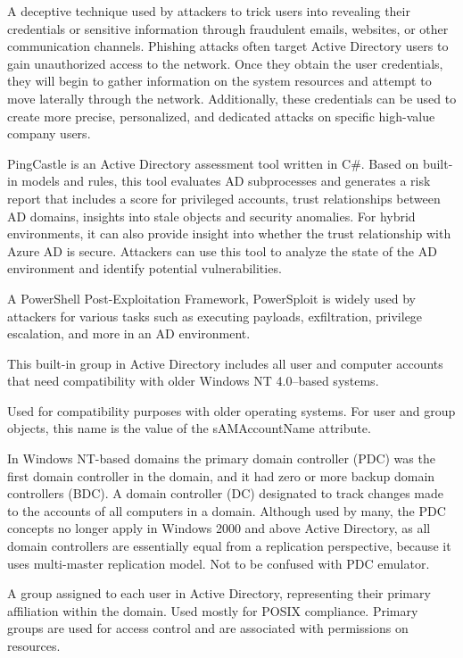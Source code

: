  A deceptive technique used by attackers to trick users into revealing their credentials or sensitive information through fraudulent emails, websites, or other communication channels. Phishing attacks often target Active Directory users to gain unauthorized access to the network. Once they obtain the user credentials, they will begin to gather information on the system resources and attempt to move laterally through the network. Additionally, these credentials can be used to create more precise, personalized, and dedicated attacks on specific high-value company users.

 PingCastle is an Active Directory assessment tool written in C#. Based on built-in models and rules, this tool evaluates AD subprocesses and generates a risk report that includes a score for privileged accounts, trust relationships between AD domains, insights into stale objects and security anomalies. For hybrid environments, it can also provide insight into whether the trust relationship with Azure AD is secure. Attackers can use this tool to analyze the state of the AD environment and identify potential vulnerabilities.

 A PowerShell Post-Exploitation Framework, PowerSploit is widely used by attackers for various tasks such as executing payloads, exfiltration, privilege escalation, and more in an AD environment.

 This built-in group in Active Directory includes all user and computer accounts that need compatibility with older Windows NT 4.0–based systems.

 Used for compatibility purposes with older operating systems. For user and group objects, this name is the value of the sAMAccountName attribute.

 In Windows NT-based domains the primary domain controller (PDC) was the first domain controller in the domain, and it had zero or more backup domain controllers (BDC). A domain controller (DC) designated to track changes made to the accounts of all computers in a domain. Although used by many, the PDC concepts no longer apply in Windows 2000 and above Active Directory, as all domain controllers are essentially equal from a replication perspective, because it uses multi-master replication model. Not to be confused with PDC emulator.

 A group assigned to each user in Active Directory, representing their primary affiliation within the domain. Used mostly for POSIX compliance. Primary groups are used for access control and are associated with permissions on resources.

